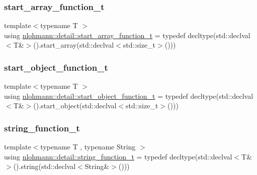 \mbox{\label{namespacenlohmann_1_1detail_a80273cecc45765d7b2826ec931fbffdd}} 
\subsubsection{\texorpdfstring{start\+\_\+array\+\_\+function\+\_\+t}{start\_array\_function\_t}}
{\footnotesize\ttfamily template$<$typename T $>$ \\
using \hyperlink{namespacenlohmann_1_1detail_a80273cecc45765d7b2826ec931fbffdd}{nlohmann\+::detail\+::start\+\_\+array\+\_\+function\+\_\+t} = typedef decltype(std\+::declval$<$T\&$>$().start\+\_\+array(std\+::declval$<$std\+::size\+\_\+t$>$()))}

\mbox{\label{namespacenlohmann_1_1detail_a5fff1e6dcaabd367d9b1109a5682f9d4}} 
\subsubsection{\texorpdfstring{start\+\_\+object\+\_\+function\+\_\+t}{start\_object\_function\_t}}
{\footnotesize\ttfamily template$<$typename T $>$ \\
using \hyperlink{namespacenlohmann_1_1detail_a5fff1e6dcaabd367d9b1109a5682f9d4}{nlohmann\+::detail\+::start\+\_\+object\+\_\+function\+\_\+t} = typedef decltype(std\+::declval$<$T\&$>$().start\+\_\+object(std\+::declval$<$std\+::size\+\_\+t$>$()))}

\mbox{\label{namespacenlohmann_1_1detail_a27c3fc3bd42ac406f763184aa8ae4cb0}} 
\subsubsection{\texorpdfstring{string\+\_\+function\+\_\+t}{string\_function\_t}}
{\footnotesize\ttfamily template$<$typename T , typename String $>$ \\
using \hyperlink{namespacenlohmann_1_1detail_a27c3fc3bd42ac406f763184aa8ae4cb0}{nlohmann\+::detail\+::string\+\_\+function\+\_\+t} = typedef decltype(std\+::declval$<$T\&$>$().string(std\+::declval$<$String\&$>$()))}

